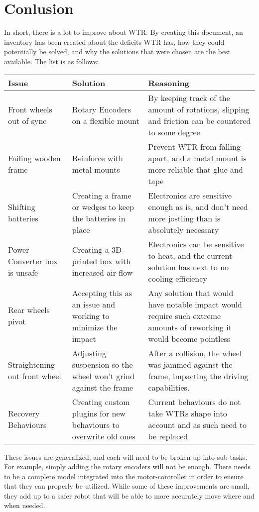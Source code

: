 \section{Conlusion}
In short, there is a lot to improve about WTR.
By creating this document, an inventory has been created about the deficits WTR has, how they could potentially be solved, and why the solutions that were chosen are the best available.
The list is as follows:

\begin{tabular}{|C{3cm}|L{6cm}|L{6cm}|}
\hline
\textbf{Issue}                 &\textbf{Solution} & \textbf{Reasoning} \\ \hline
Front wheels out of sync       &Rotary Encoders on a flexible mount    & By keeping track of the amount of rotations, slipping and friction can be countered to some degree \\ \hline
Failing wooden frame           & Reinforce with metal mounts    & Prevent WTR from falling apart, and a metal mount is more reliable that glue and tape \\ \hline
Shifting batteries    & Creating a frame or wedges to keep the batteries in place & Electronics are sensitive enough as is, and don't need more jostling than is absolutely necessary \\ \hline
Power Converter box is unsafe & Creating a 3D-printed box with increased air-flow & Electronics can be sensitive to heat, and the current solution has next to no cooling efficiency \\ \hline
Rear wheels pivot    & Accepting this as an issue and working to minimize the impact & Any solution that would have notable impact would require such extreme amounts of reworking it would become pointless \\ \hline
Straightening out front wheel & Adjusting suspension so the wheel won't grind against the frame & After a collision, the wheel was jammed against the frame, impacting the driving capabilities. \\ \hline
Recovery Behaviours & Creating custom plugins for new behaviours to overwrite old ones & Current behaviours do not take WTRs shape into account and as such need to be replaced \\ \hline
\end{tabular}

These issues are generalized, and each will need to be broken up into sub-tasks.
For example, simply adding the rotary encoders will not be enough.
There needs to be a complete model integrated into the motor-controller in order to ensure that they can properly be utilized.
While some of these improvements are small, they add up to a safer robot that will be able to more accurately move where and when needed.

\newpage